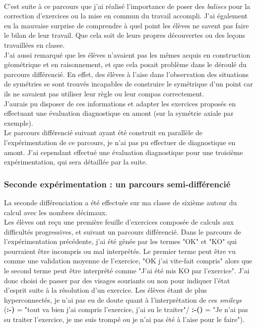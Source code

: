 \paragraph{}C'est suite à ce parcours que j'ai réalisé l'importance de poser des \textit{balises} pour la correction d'exercices ou la mise en commun du travail accompli. J'ai également eu la mauvaise surprise de comprendre à quel point les élèves ne savent pas faire le bilan de leur travail. Que cela soit de leurs propres découvertes ou des leçons travaillées en classe.\\
J'ai aussi remarqué que les élèves n'avaient pas les mêmes acquis en construction géométrique et en raisonnement, et que cela posait problème dans le déroulé du parcours différencié. En effet, des élèves à l'aise dans l'observation des situations de symétries se sont trouvés incapables de construire le symétrique d'un point car ils ne savaient pas utiliser leur règle ou leur compas correctement.\\
J'aurais pu disposer de ces informations et adapter les exercices proposés en effectuant une évaluation diagnostique en amont (sur la symétrie axiale par exemple).\\
Le parcours différencié suivant ayant été construit en parallèle de l'expérimentation de ce parcours, je n'ai pas pu effectuer de diagnostique en amont. J'ai cependant effectué une évaluation diagnostique pour une troisième expérimentation, qui sera détaillée par la suite.\\


\subsubsection{Seconde expérimentation : un parcours semi-différencié}
La seconde différenciation a été effectuée sur ma classe de sixième autour du calcul avec les nombres décimaux.\\
Les élèves ont reçu une première feuille d'exercices composée de calculs aux difficultés progressives, et suivant un parcours différencié. Dans le parcours de l'expérimentation précédente, j'ai été gênée par les termes "OK" et "KO" qui pourraient être incompris ou mal interprétés. Le premier terme peut être vu comme une validation moyenne de l'exercice, "OK j'ai vite-fait compris" alors que le second terme peut être interprété comme "J'ai été mis KO par l'exercice". J'ai donc choisi de passer par des visages souriants ou non pour indiquer l'état d'esprit suite à la résolution d'un exercice. Les élèves étant de plus hyperconnectés, je n'ai pas eu de doute quant à l'interprétation de ces \textit{smileys} (\textbf{:-)} = "tout va bien j'ai compris l'exercice, j'ai su le traiter"/  \textbf{:-()} = "Je n'ai pas su traiter l'exercice, je me suis trompé ou je n'ai pas été à l'aise pour le faire").
